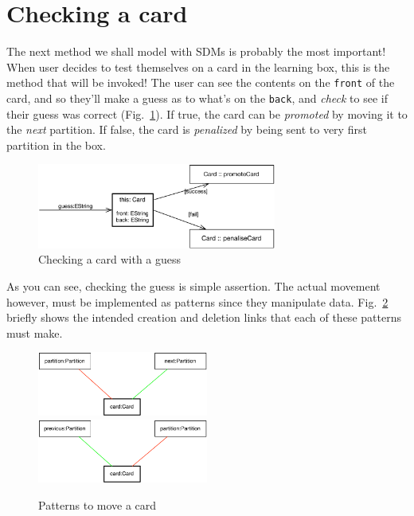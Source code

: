 \newpage
\section{Checking a card}
\genHeader
\hypertarget{sec:checkCard}{}

The next method we shall model with SDMs is probably the most important! When user decides to test themselves on a card in the learning box, this is the method
that will be invoked! The user can see the contents on the \texttt{front} of the card, and so they'll make a guess as to what's on the \texttt{back}, and
\emph{check} to see if their guess was correct (Fig.~\ref{fig:goal_check}). If true, the card can be \emph{promoted} by moving it to the \emph{next} partition.
If false, the card is \emph{penalized} by being sent to very first partition in the box.

\begin{figure}[htbp]
 	\centering
   \includegraphics[width=0.7\textwidth]{checkCard_main.pdf}
 	\caption{Checking a card with a guess}
 	\label{fig:goal_check}
\end{figure}
\FloatBarrier

As you can see, checking the guess is simple assertion. The actual movement however, must be implemented as patterns since they manipulate data.
Fig.~\ref{fig:patterns_check} briefly shows the intended creation and deletion links that each of these patterns must make.

\begin{figure}[htbp]
 	\centering
   \includegraphics[width=0.5\textwidth]{checkCard_promote.pdf}
   \\ \vspace{1cm}
    \includegraphics[width=0.5\textwidth]{checkCard_penalize.pdf}
 	\caption{Patterns to move a card}
 	\label{fig:patterns_check}
\end{figure}
\FloatBarrier


